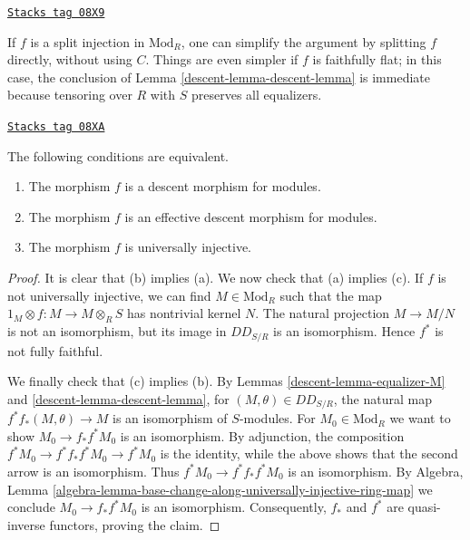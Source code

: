 \begin{remark}
\label{descent-remark-descent-lemma}
\href{https://stacks.math.columbia.edu/tag/08X9}{\texttt{Stacks tag 08X9}}

If $f$ is a split injection in $\text{Mod}_R$, one can simplify the argument by
splitting $f$ directly,
without using $C$. Things are even simpler if $f$ is faithfully flat; in this
case,
the conclusion of Lemma \ref{descent-lemma-descent-lemma}
is immediate because tensoring over $R$ with $S$ preserves all equalizers.
\end{remark}

\begin{theorem}[Descent]
\label{descent-theorem-descent}
\href{https://stacks.math.columbia.edu/tag/08XA}{\texttt{Stacks tag 08XA}}

The following conditions are equivalent.
\begin{enumerate}
\item[(a)] The morphism $f$ is a descent morphism for modules.
\item[(b)] The morphism $f$ is an effective descent morphism for modules.
\item[(c)] The morphism $f$ is universally injective.
\end{enumerate}
\end{theorem}

\begin{proof}

It is clear that (b) implies (a). We now check that (a) implies (c). If $f$ is
not universally injective, we can find $M \in \text{Mod}_R$ such that the map
$1_M \otimes f: M \to M \otimes_R S$ has nontrivial kernel $N$.
The natural projection $M \to M/N$ is not an isomorphism, but its image in
$DD_{S/R}$ is an isomorphism.
Hence $f^*$ is not fully faithful.

\medskip\noindent
We finally check that (c) implies (b). By Lemmas
\ref{descent-lemma-equalizer-M} and \ref{descent-lemma-descent-lemma}, for
$(M, \theta) \in DD_{S/R}$,
the natural map $f^* f_*(M,\theta) \to M$ is an isomorphism of $S$-modules.
For $M_0 \in \text{Mod}_R$ we want to show $M_0 \to f_*f^*M_0$ is an
isomorphism. By adjunction, the composition
$f^*M_0 \to f^*f_*f^*M_0 \to f^*M_0$ is the identity, while the above
shows that the second arrow is an isomorphism. Thus
$f^*M_0 \to f^*f_*f^*M_0$ is an isomorphism. By Algebra, Lemma
\ref{algebra-lemma-base-change-along-universally-injective-ring-map}
we conclude $M_0 \to f_* f^* M_0$ is an isomorphism.
Consequently, $f_*$ and $f^*$ are  quasi-inverse functors, proving the claim.
\end{proof}

